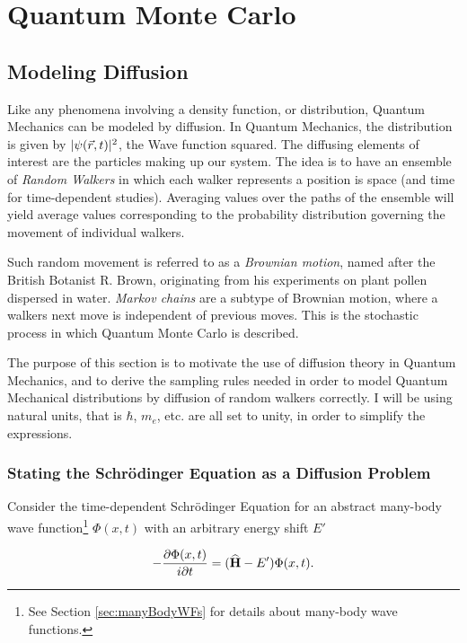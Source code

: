 \chapter{Quantum Monte Carlo}

\section{Modeling Diffusion}

Like any phenomena involving a density function, or distribution, Quantum Mechanics can be modeled by diffusion. In Quantum Mechanics, the distribution is given by $|\psi(\vec r, t)|^2$, the Wave function squared. The diffusing elements of interest are the particles making up our system. The idea is to have an ensemble of \textit{Random Walkers} in which each walker represents a position is space (and time for time-dependent studies). Averaging values over the paths of the ensemble will yield average values corresponding to the probability distribution governing the movement of individual walkers. 

Such random movement is referred to as a \textit{Brownian motion}, named after the British Botanist R. Brown, originating from his experiments on plant pollen dispersed in water. \textit{Markov chains} are a subtype of Brownian motion, where a walkers next move is independent of previous moves. This is the stochastic process in which Quantum Monte Carlo is described.

The purpose of this section is to motivate the use of diffusion theory in Quantum Mechanics, and to derive the sampling rules needed in order to model Quantum Mechanical distributions by diffusion of random walkers correctly. I will be using natural units, that is $\hbar$, $m_e$, etc. are all set to unity, in order to simplify the expressions.

\subsection{Stating the Schrödinger Equation as a Diffusion Problem}
\label{sec:statingDiff}

Consider the time-dependent Schrödinger Equation for an abstract many-body wave function\footnote{See Section \ref{sec:manyBodyWFs} for details about many-body wave functions.} $\Phi(x, t)$ with an arbitrary energy shift $E'$

\begin{equation}
 -\frac{\partial \Phi(x, t)}{i\partial t} = ({\bf\widehat{H}} - E')\Phi(x, t).
\end{equation}

